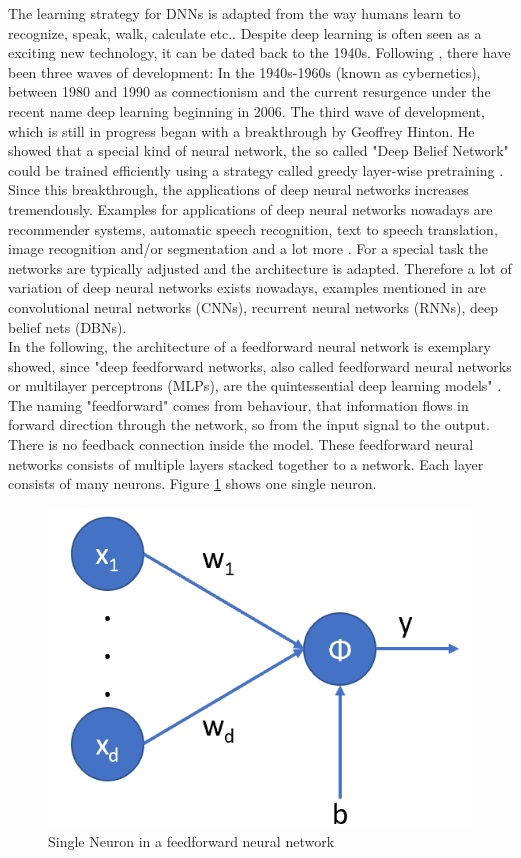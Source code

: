 \documentclass[12pt,DIV14,BCOR12mm,a4paper,footexclude,headinclude,halfparskip-,twoside,openright,openany,cleardoubleempty,idxtotoc,bibtotoc]{scrreprt} %
\numberwithin{equation}{chapter}
\begin{document}
The learning strategy for DNNs is adapted from the way humans learn to recognize, speak, walk, calculate etc.. Despite deep learning is often seen as a exciting new technology, it can be dated back to the 1940s. Following \cite{Goodfellow-et-al-2016}, there have been three waves of development: In the 1940s-1960s (known as cybernetics), between 1980 and 1990 as connectionism and the current resurgence under the recent name deep learning beginning in 2006. The third wave of development, which is still in progress began with a breakthrough by Geoffrey Hinton. He showed that a special kind of neural network, the so called "Deep Belief Network" could be trained efficiently using a strategy called greedy layer-wise pretraining \cite{Hinton-et-al-2006}.\\
Since this breakthrough, the applications of deep neural networks increases tremendously. Examples for applications of deep neural networks nowadays are recommender systems, automatic speech recognition, text to speech translation, image recognition and/or segmentation and a lot more \cite{DeepLearningDive}. For a special task the networks are typically adjusted and the architecture is adapted. Therefore a lot of variation of deep neural networks exists nowadays, examples mentioned in \cite{Nielsen-Michael} are convolutional neural networks (CNNs), recurrent neural networks (RNNs), deep belief nets (DBNs).\\
In the following, the architecture of a feedforward neural network is exemplary showed, since "deep feedforward networks, also called feedforward neural networks or multilayer perceptrons (MLPs), are the quintessential deep learning models" \cite{Goodfellow-et-al-2016}. The naming "feedforward" comes from behaviour, that information flows in forward direction through the network, so from the input signal to the output. There is no feedback connection inside the model. These feedforward neural networks consists of multiple layers stacked together to a network. Each layer consists of many neurons. Figure \ref{fig:SingleNeuron} shows one single neuron.
\begin{figure}[htb!]
	\centering
	\includegraphics[width=0.3\linewidth]{Graphiken/SingleNeuron}
	\caption{Single Neuron in a feedforward neural network}
	\label{fig:SingleNeuron}
\end{figure}
\end{document}
